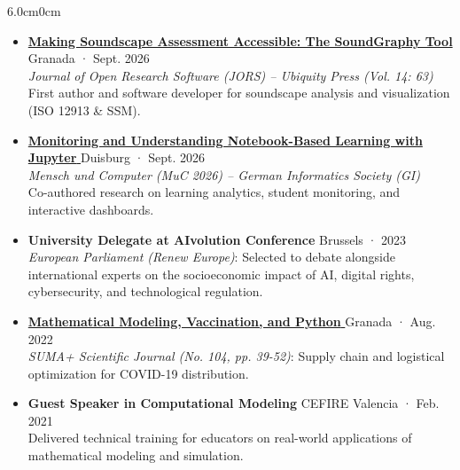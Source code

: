 \documentclass[10pt, a4paper]{article}
\begin{document}
\begin{adjustwidth}{6.0cm}{0cm}
\begin{itemize}[leftmargin=*, nosep, topsep=1pt, itemsep=2pt]
    \item \href{https://doi.org/10.5334/jors.771}{\textbf{\color{darktext}\footnotesize Making Soundscape Assessment Accessible: The SoundGraphy Tool \faExternalLink*}} \hfill {\scriptsize\color{lightgray} Granada · Sept. 2026}\\
    {\scriptsize\textit{Journal of Open Research Software (JORS) -- Ubiquity Press (Vol. 14: 63)}}\\
    {\scriptsize First author and software developer for soundscape analysis and visualization (ISO 12913 \& SSM).}
    \item \href{https://dl.gi.de/items/4b863f76-35d4-4ec3-a18b-427b56539919}{\textbf{\color{darktext}\footnotesize Monitoring and Understanding Notebook-Based Learning with Jupyter \faExternalLink*}} \hfill {\scriptsize\color{lightgray} Duisburg · Sept. 2026}\\
    {\scriptsize\textit{Mensch und Computer (MuC 2026) -- German Informatics Society (GI)}}\\
    {\scriptsize Co-authored research on learning analytics, student monitoring, and interactive dashboards.}
    \item \textbf{\color{darktext}\footnotesize University Delegate at AIvolution Conference} \hfill {\scriptsize\color{lightgray} Brussels · 2023}\\
    {\scriptsize\textit{European Parliament (Renew Europe)}: Selected to debate alongside international experts on the socioeconomic impact of AI, digital rights, cybersecurity, and technological regulation.}
    \item \href{https://revistasuma.es/wp-content/uploads/suma/Suma104/S104w_039-052.pdf}{\textbf{\color{darktext}\footnotesize Mathematical Modeling, Vaccination, and Python \faExternalLink*}} \hfill {\scriptsize\color{lightgray} Granada · Aug. 2022}\\
    {\scriptsize\textit{SUMA+ Scientific Journal (No. 104, pp. 39-52)}: Supply chain and logistical optimization for COVID-19 distribution.}
    \item \textbf{\color{darktext}\footnotesize Guest Speaker in Computational Modeling} \hfill {\scriptsize\color{lightgray} CEFIRE Valencia · Feb. 2021}\\
    {\scriptsize Delivered technical training for educators on real-world applications of mathematical modeling and simulation.}
\end{itemize}


\end{adjustwidth}
\end{document}
